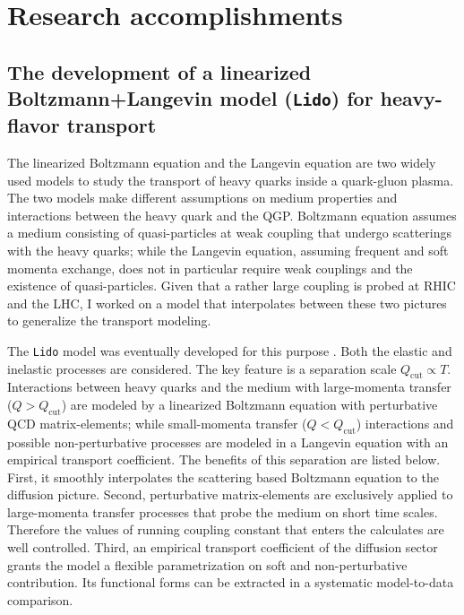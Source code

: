 \documentclass[12pt,a4paper]{article}
\begin{document}
\section{Research accomplishments}
\subsection{The development of a linearized Boltzmann+Langevin model ({\tt Lido}) for heavy-flavor transport}

The linearized Boltzmann equation and the Langevin equation are two widely  used models to study the transport of heavy quarks inside a quark-gluon plasma.
The two models make different assumptions on medium properties and interactions between the heavy quark and the QGP.
Boltzmann equation assumes a medium consisting of quasi-particles at weak coupling that undergo scatterings with the heavy quarks; while the Langevin equation, assuming frequent and soft momenta exchange, does not in particular require weak couplings and the existence of quasi-particles.
Given that a rather large coupling is probed at RHIC and the LHC, I worked on a model that interpolates between these two pictures to generalize the transport modeling.

The {\tt Lido} model was eventually developed for this purpose \cite{Ke:2018tsh, Ke:2018jem}. Both the elastic and inelastic processes are considered.
The key feature is a separation scale $Q_{\textrm{cut}}\propto T$. Interactions between heavy quarks and the medium with large-momenta transfer ($Q > Q_{\textrm{cut}}$) are modeled by a linearized Boltzmann equation with perturbative QCD matrix-elements;  while small-momenta transfer ($Q < Q_{\textrm{cut}}$) interactions and possible non-perturbative processes are modeled in a Langevin equation with an empirical transport coefficient. The benefits of this separation are listed below. First, it smoothly interpolates the scattering based Boltzmann equation to the diffusion picture. Second, perturbative matrix-elements are exclusively applied to large-momenta transfer processes that probe the medium on short time scales. Therefore the values of running coupling constant that enters the calculates are well controlled. Third, an empirical transport coefficient of the diffusion sector grants the model a flexible parametrization on soft and non-perturbative contribution. Its functional forms can be extracted in a systematic model-to-data comparison.
\end{document}
